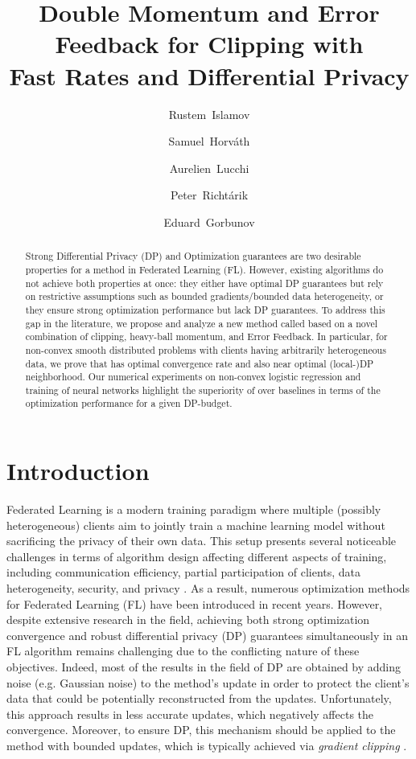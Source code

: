 \documentclass[a4paper,11pt]{article}
\title{
\toptitlebar
{{\center\baselineskip 18pt
                      {\Large\bf Double Momentum and Error Feedback for Clipping with \\ Fast Rates and Differential Privacy}}
} 
\bottomtitlebar}
\date{}
\author[1]{Rustem~Islamov}
\author[2]{Samuel~Horv{\'a}th}
\author[1]{Aurelien~Lucchi}
\author[3]{Peter~Richt{\'a}rik}
\author[2]{Eduard~Gorbunov}
\affil[1]{University of Basel}
\affil[2]{Mohamed bin Zayed University of Artificial Intelligence (MBZUAI)}
\affil[3]{King~Abdullah~University~of~Science~and~Technology~(KAUST)}
\begin{document}
\maketitle

\begin{abstract}
Strong Differential Privacy (DP) and Optimization guarantees are two desirable properties for a method in Federated Learning (FL). However, existing algorithms do not achieve both properties at once: they either have optimal DP guarantees but rely on restrictive assumptions such as bounded gradients/bounded data heterogeneity, or they ensure strong optimization performance but lack DP guarantees. To address this gap in the literature, we propose and analyze a new method called  based on a novel combination of clipping, heavy-ball momentum, and Error Feedback. In particular, for non-convex smooth distributed problems with clients having arbitrarily heterogeneous data, we prove that  has optimal convergence rate and also near optimal (local-)DP neighborhood. Our numerical experiments on non-convex logistic regression and training of neural networks highlight the superiority of  over baselines in terms of the optimization performance for a given DP-budget.
\end{abstract}

\tableofcontents

\section{Introduction}

Federated Learning \citep{konevcny2016federated, mcmahan2017communication} is a modern training paradigm where multiple (possibly heterogeneous) clients aim to jointly train a machine learning model without sacrificing the privacy of their own data. This setup presents several noticeable challenges in terms of algorithm design affecting different aspects of training, including communication efficiency, partial participation of clients, data heterogeneity, security, and privacy \citep{kairouz2021advances, wang2021field}. As a result, numerous optimization methods for Federated Learning (FL) have been introduced in recent years. However, despite extensive research in the field, achieving both strong optimization convergence and robust differential privacy (DP) guarantees \citep{dwork2014algorithmic} simultaneously in an FL algorithm remains challenging due to the conflicting nature of these objectives.
Indeed, most of the results in the field of DP are obtained by adding noise (e.g. Gaussian noise) to the method's update \citep{abadi2016deep, chen2020understanding} in order to protect the client's data that could be potentially reconstructed from the updates. Unfortunately, this approach results in less accurate updates, which negatively affects the convergence. Moreover, to ensure DP, this mechanism should be applied to the method with bounded updates, which is typically achieved via \emph{gradient clipping} \citep{pascanu2013difficulty}.
\end{document}
